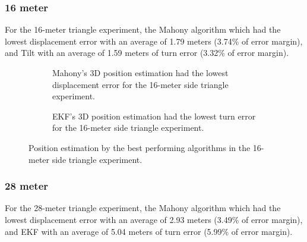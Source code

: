 \newpage

\subsubsection{16 meter}

For the 16-meter triangle experiment, the Mahony algorithm which had the lowest displacement error with an average of 1.79 meters (3.74\% of error margin), and Tilt with an average of 1.59 meters of turn error (3.32\% of error margin).

\vspace{-0.5cm}

\vspace{-1.5cm}

\begin{figure}[H]
    \centering
    \begin{subfigure}{0.49\textwidth}
        \centering
        \resizebox{1\linewidth}{!}{}
        \caption{Mahony's 3D position estimation had the lowest displacement error for the 16-meter side triangle experiment.}
        \label{fig:triangle16_2D}
    \end{subfigure}
    \begin{subfigure}{0.49\textwidth}
        \centering
        \resizebox{1\linewidth}{!}{}
        \caption{EKF's 3D position estimation had the lowest turn error for the 16-meter side triangle experiment.}
        \label{fig:triangle16_3D}
    \end{subfigure}
    \caption{Position estimation by the best performing algorithms in the 16-meter side triangle experiment.}
    \label{fig:triangle16}
\end{figure}

\subsubsection{28 meter}

For the 28-meter triangle experiment, the Mahony algorithm which had the lowest displacement error with an average of 2.93 meters (3.49\% of error margin), and EKF with an average of 5.04 meters of turn error (5.99\% of error margin).

\vspace{-0.5cm}

\vspace{-1.5cm}

